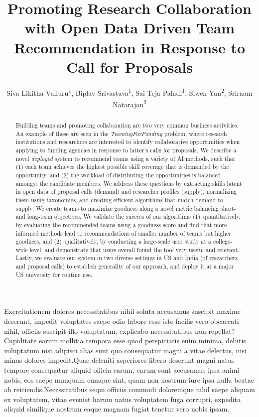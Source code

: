 \documentclass[letterpaper]{article} %
\title{Promoting Research Collaboration with Open Data Driven Team Recommendation in Response to Call for Proposals}
\author {
    Siva Likitha Valluru\textsuperscript{\rm 1},
    Biplav Srivastava\textsuperscript{\rm 1},
    Sai Teja Paladi\textsuperscript{\rm 1},
    Siwen Yan\textsuperscript{\rm 2},
    Sriraam Natarajan\textsuperscript{\rm 2}
}
\begin{document}
\maketitle

\begin{abstract}
Building teams and promoting collaboration
are two very common business activities. An example of these are seen in the {\em TeamingForFunding} problem, where research institutions and researchers are interested to identify collaborative opportunities when applying to funding agencies in response to latter's calls for proposals. We describe a novel {\em deployed} system to recommend teams using a variety of AI methods, such that (1) each team achieves the highest possible  skill coverage that is demanded by the opportunity, and (2) the workload of distributing the opportunities is balanced amongst the candidate members. We address these questions by extracting skills latent in open data of proposal calls (demand) and researcher profiles (supply), normalizing them using taxonomies, and creating efficient algorithms that match demand to supply. We create teams to maximize goodness along a novel metric balancing short- and long-term objectives. We validate the success of our algorithms (1)~quantitatively, by evaluating the recommended teams using a goodness score and find that more informed methods lead to recommendations of smaller number of teams but higher goodness, and (2)~qualitatively, by conducting a large-scale user study at a college-wide level, and demonstrate that users overall found the tool very useful and relevant. Lastly, we evaluate our system in two diverse settings in US and India (of researchers and proposal calls) to establish generality of our approach, and deploy it at a major US university for routine use.

\end{abstract}











\bigskip

Exercitationem dolores necessitatibus nihil soluta accusamus suscipit maxime deserunt, impedit voluptates saepe odio labore esse iste facilis vero obcaecati nihil, officiis suscipit illo voluptatum, explicabo necessitatibus non repellat?Cupiditate earum mollitia tempora esse quod perspiciatis enim minima, debitis voluptatum nisi adipisci alias sunt quo consequatur magni a vitae delectus, nisi minus dolores impedit.Quae deleniti asperiores libero deserunt magni natus tempore consequatur aliquid officia earum, earum sunt accusamus ipsa animi nobis, eos saepe numquam cumque sint, quam non nostrum iure ipsa nulla beatae ab reiciendis.Necessitatibus sequi officiis commodi doloremque nihil saepe aliquam ex voluptatem, vitae eveniet harum natus voluptatem fuga corrupti, expedita aliquid similique nostrum eaque magnam fugiat tenetur vero nobis ipsam.\clearpage

\end{document}
